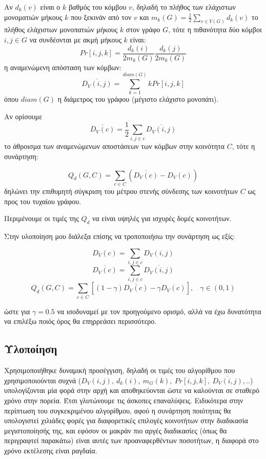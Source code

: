 \documentclass[12pt, letterpaper]{article}
\begin{document}
Αν $d_k(v)$ είναι ο $k$ βαθμός του κόμβου $v$, δηλαδή το πλήθος των 
ελάχιστων μονοματιών μήκους $k$ που ξεκινάν από τον $v$ και 
$m_k(G) = \frac{1}{2} \sum_{v \in V (G)} d_k(v)$ το πλήθος 
ελάχιστων μονοπατιών μήκους $k$ στον γράφο $G$, τότε η πιθανότητα δύο κόμβοι
$i,j \in G$ να συνδέονται με ακμή μήκους $k$ είναι:
\[ Pr[i,j,k] = \frac{d_k(i)}{2m_k(G)} \frac{d_k(j)}{2m_k(G)} \]
η αναμενώμενη απόσταση των κόμβων:
\[ \overline{D_V(i,j)} = \sum_{k=1}^{diam(G)} k Pr[i,j,k] \]
όπου $diam(G)$ η διάμετρος του γράφου (μέγιστο ελάχιστο μονοπάτι).

Αν ορίσουμε
\[ \overline{ D_V(c)  } = \frac{1}{2} \sum_{i,j \in c} \overline{ D_V(i,j) }\]
το άθροισμα των αναμενώμενων αποστάσεων των κόμβων στην κοινότητα $C$, 
τότε η συνάρτηση:

\[ Q_d(G,C) = \sum_{c \in C} (\overline{ D_V(c) } - D_V(c))\]
δηλώνει την επιθυμητή σύγκριση του μέτρου στενής σύνδεσης των κοινοτήτων 
$C$ ως προς του τυχαίου γράφου. 

Περιμένουμε οι τιμές της $Q_d$ να είναι υψηλές για ισχυρές δομές κοινοτήτων.


Στην υλοποίηση μου διάλεξα επίσης να τροποποιήσω την συνάρτηση ως εξίς:

\[ D_V(c) = \sum_{i,j \in c} D_V(i,j) \]
\[ \overline{ D_V(c)  } =  \sum_{i,j \in c} \overline{ D_V(i,j) }\]
\[ Q_d(G,C) = \sum_{c \in C} [(1 - \gamma)\overline{ D_V(c) } - \gamma D_V(c) ],  \ \ \ \ \gamma \in (0,1)\]

ώστε για $\gamma = 0.5$ να ισοδυναμεί με τον προηγούμενο ορισμό, αλλά να έχω 
δυνατότητα να επιλέξω ποιός όρος θα επηρρεάσει περισσότερο.



\subsection{Υλοποίηση}


Χρησιμοποιήθηκε δυναμική προσέγγιση, δηλαδή οι τιμές του αλγορίθμου που χρησιμοποιούνται 
συχνά ($D_V(i,j), \ d_k(i), \ m_G(k), \ Pr[i,j,k],  \ \overline{D_V(i,j)},..$)
υπολογίζονται μία φορά στην αρχή και αποθηκεύονται ώστε να καλούνται σε σταθερό χρόνο στην πορεία. Έτσι γλυτώνουμε τις 
άσκοπες επαναλύψεις. Ειδικότερα στην περίπτωση του συγκεκριμένου αλγορίθμου, αφού 
η συνάρτηση ποιότητας θα υπολογιστεί χιλιάδες φορές για διαφορετικές 
επιλογές κοινοτήτων στην διαδικασία μεγιστοποίησής της, και εφόσον οι μακράν 
πιο αργές διαδικασίες (όπως θα περιγραφτεί παρακάτω) είναι αυτές των 
προαναφερθέντων ποσοτήτων, η διαφορά στο χρόνο εκτέλεσης είναι ραγδαία. 
\end{document}
